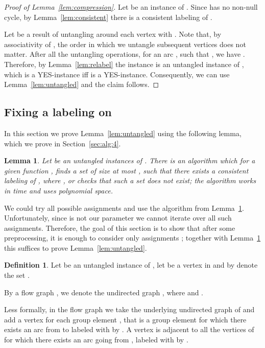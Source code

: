 \documentclass[11pt]{article}
\newtheorem{lemma}[theorem]{Lemma}
\theoremstyle{definition}
\newtheorem{definition}[theorem]{Definition}
\newcommand{\cgfvsshort}{{\sc{C-GFVS}}\xspace}
\begin{document}
\begin{proof}[Proof of Lemma~\ref{lem:compression}]
Let  be an instance of \cgfvsshort.
Since  has no non-null cycle, by Lemma~\ref{lem:consistent}
there is a consistent labeling  of .

Let  be a result of untangling  around each
vertex  with . 
Note that, by associativity of , the order in which we untangle subsequent vertices does not matter.
After all the untangling operations, for an arc ,
such that , we have .
Therefore, by Lemma~\ref{lem:relabel} the instance 
is an untangled instance of \cgfvsshort, which is a YES-instance
iff  is a YES-instance.
Consequently, we can use Lemma~\ref{lem:untangled} and the claim follows.
\end{proof}

\subsection{Fixing a labeling on }
\label{sec:alg:3}

In this section we prove Lemma~\ref{lem:untangled} using the following lemma, which we prove in Section~\ref{sec:alg:4}.

\begin{lemma}
\label{lem:fixed}
Let  be an untangled instances of \cgfvsshort.
There is an algorithm which for a given
function ,
finds a set  of size at most ,
such that there exists a consistent labeling 
 of ,
where ,
or checks that such a set  does not exist; the algorithm works in  time and uses polynomial space.
\end{lemma}

We could try all 
possible assignments  and use the algorithm from Lemma~\ref{lem:fixed}.
Unfortunately, since  is not our parameter we cannot 
iterate over all such assignments. Therefore, the goal of
this section is to show that after some preprocessing,
it is enough to consider only  assignments ; together with Lemma~\ref{lem:fixed} this suffices to prove Lemma~\ref{lem:untangled}.

\begin{definition}
Let  be an untangled instance of \cgfvsshort,
let  be a vertex in  and by  denote 
the set .

By a flow graph , we denote the undirected
graph , where 
and .
\end{definition}

Less formally, in the flow graph we take the underlying undirected graph of 
and add a vertex for each group element , 
that is a group element for which there exists an arc from  to  
labeled with  by .
A vertex  is adjacent to all the vertices of 
for which there exists an arc going from , labeled with  by .
\end{document}
